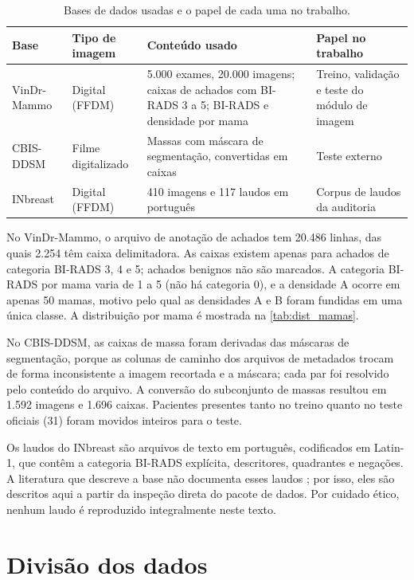 \begin{table}[htb]
  \centering
  \caption{Bases de dados usadas e o papel de cada uma no trabalho.}
  \label{tab:bases}
  \small
  \begin{tabular}{@{}p{2.4cm}p{2.6cm}p{4.6cm}p{4.2cm}@{}}
    \toprule
    Base & Tipo de imagem & Conteúdo usado & Papel no trabalho \\
    \midrule
    VinDr-Mammo \cite{nguyen2023vindr} & Digital (FFDM) & 5.000 exames, 20.000 imagens; caixas de achados com BI-RADS 3 a 5; BI-RADS e densidade por mama & Treino, validação e teste do módulo de imagem \\
    CBIS-DDSM \cite{lee2017cbis} & Filme digitalizado & Massas com máscara de segmentação, convertidas em caixas & Teste externo \\
    INbreast \cite{moreira2012inbreast} & Digital (FFDM) & 410 imagens e 117 laudos em português & Corpus de laudos da auditoria \\
    \bottomrule
  \end{tabular}
\end{table}

No VinDr-Mammo, o arquivo de anotação de achados tem 20.486 linhas, das quais 2.254 têm caixa delimitadora. As caixas existem apenas para achados de categoria BI-RADS 3, 4 e 5; achados benignos não são marcados. A categoria BI-RADS por mama varia de 1 a 5 (não há categoria 0), e a densidade A ocorre em apenas 50 mamas, motivo pelo qual as densidades A e B foram fundidas em uma única classe. A distribuição por mama é mostrada na \autoref{tab:dist_mamas}.

No CBIS-DDSM, as caixas de massa foram derivadas das máscaras de segmentação, porque as colunas de caminho dos arquivos de metadados trocam de forma inconsistente a imagem recortada e a máscara; cada par foi resolvido pelo conteúdo do arquivo. A conversão do subconjunto de massas resultou em 1.592 imagens e 1.696 caixas. Pacientes presentes tanto no treino quanto no teste oficiais (31) foram movidos inteiros para o teste.

Os laudos do INbreast são arquivos de texto em português, codificados em Latin-1, que contêm a categoria BI-RADS explícita, descritores, quadrantes e negações. A literatura que descreve a base não documenta esses laudos \cite{moreira2012inbreast}; por isso, eles são descritos aqui a partir da inspeção direta do pacote de dados. Por cuidado ético, nenhum laudo é reproduzido integralmente neste texto.

\section{Divisão dos dados}

